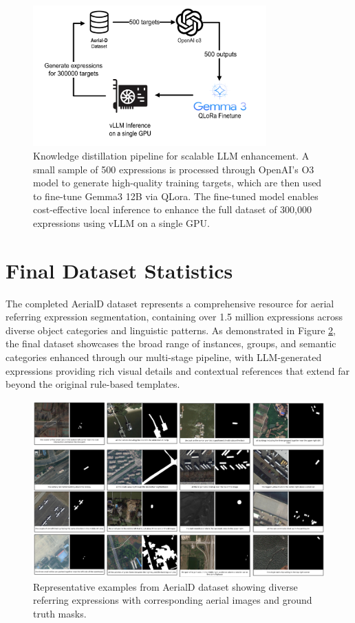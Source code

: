 \begin{figure}[H]
\centering
\includegraphics[width=0.8\textwidth]{./Images/distillation.png}
\caption{Knowledge distillation pipeline for scalable LLM enhancement. A small sample of 500 expressions is processed through OpenAI's O3 model to generate high-quality training targets, which are then used to fine-tune Gemma3 12B via QLora. The fine-tuned model enables cost-effective local inference to enhance the full dataset of 300,000 expressions using vLLM on a single GPU.}
\label{fig:llm_distillation}
\end{figure}


\section{Final Dataset Statistics}

The completed AerialD dataset represents a comprehensive resource for aerial referring expression segmentation, containing over 1.5 million expressions across diverse object categories and linguistic patterns. As demonstrated in Figure \ref{fig:dataset_examples}, the final dataset showcases the broad range of instances, groups, and semantic categories enhanced through our multi-stage pipeline, with LLM-generated expressions providing rich visual details and contextual references that extend far beyond the original rule-based templates.

\begin{figure}[H]
\centering
\includegraphics[width=\textwidth]{./Images/dataset.png}
\caption{Representative examples from AerialD dataset showing diverse referring expressions with corresponding aerial images and ground truth masks.}
\label{fig:dataset_examples}
\end{figure}

